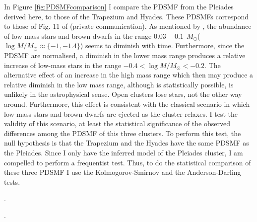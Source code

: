 In Figure \ref{fig:PDSMFcomparison} I compare the PDSMF from the Pleiades derived here, to those of the Trapezium and Hyades. These PDSMFs correspond to those of  Fig. 11 of \citet{Bouy2015} (private communication). As mentioned by \citet{Bouy2015}, the abundance of low-mass stars and brown dwarfs in the range $0.03 - 0.1 \ \ M_{\odot}$($\log M/M_{\odot} \approx \{-1, -1.4\}$) seems to diminish with time. Furthermore, since the PDSMF are normalised, a diminish in the lower mass range produces a relative increase of low-mass stars in the range $-0.4 < \log M/M_{\odot} < -0.2$. The alternative effect of an increase in the high mass range which then may produce a relative diminish in the low mass range, although is statistically possible, is unlikely in the astrophysical sense. Open clusters lose stars, not the other way around. Furthermore, this effect is consistent with the classical scenario in which low-mass stars and brown dwarfs are ejected as the cluster relaxes. I test the validity of this scenario, at least the statistical significance of the observed differences among the PDSMF of this three clusters. To perform this test, the null hypothesis is that the Trapezium and the Hyades have the same PDSMF as the Pleiades. Since I only have the inferred model of the Pleiades cluster, I am compelled to perform a frequentist test. Thus, to do the statistical comparison of these three PDSMF I use the Kolmogorov-Smirnov and the Anderson-Darling tests. 

\begin{figure*}[htp]
\begin{center}
\caption{Left: PDSMFs of the Pleiades (derived here for $J,H,K_s$ bands), Trapezium, and Hyades, from \citet{Bouy2015}. They are normalised in the interval of completeness.}
\label{fig:PDSMFcomparison}.
\end{center}
\end{figure*}

\begin{figure*}[htp]
\begin{center}
\caption{Cumulative distribution functions (CDF) of the PDSMFs from left panel and that of \citet{Chabrier2005} and \citet{Thies2007} system initial mass function (normalised also in the interval of completeness). The Pleiades CDF shown is just from $K_s$ band. The grey area depicts the area in which the null hypothesis of same PDSMF as that of the Pleiades can not be rejected (at $\alpha=0.01$).}
\label{fig:PDSMFtest}.
\end{center}
\end{figure*}


